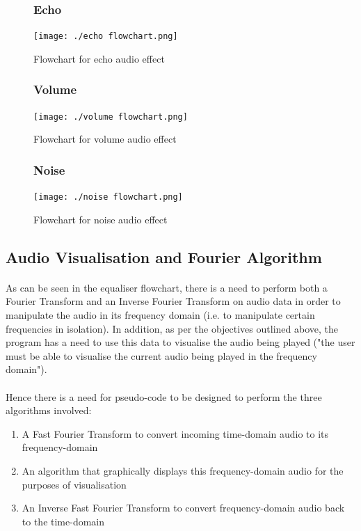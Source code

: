\begin{figure}[H]
	\subsubsection{Echo}
	\texttt{[image: ./echo flowchart.png]}
	\caption{Flowchart for echo audio effect}
\end{figure}

\begin{figure}[H]
	\subsubsection{Volume}
	\texttt{[image: ./volume flowchart.png]}
	\caption{Flowchart for volume audio effect}
\end{figure}

\begin{figure}[H]
	\subsubsection{Noise}
	\texttt{[image: ./noise flowchart.png]}
	\caption{Flowchart for noise audio effect}
\end{figure}

\pagebreak
\subsection{Audio Visualisation and Fourier Algorithm}

\paragraph{} As can be seen in the equaliser flowchart, there is a need to perform both a Fourier Transform and an Inverse Fourier Transform on audio data in order to manipulate the audio in its frequency domain (i.e. to manipulate certain frequencies in isolation). In addition, as per the objectives outlined above, the program has a need to use this data to visualise the audio being played ("the user must be able to visualise the current audio being played in the frequency domain").

\paragraph{} Hence there is a need for pseudo-code to be designed to perform the three algorithms involved:
\begin{enumerate}
	\item A Fast Fourier Transform to convert incoming time-domain audio to its frequency-domain
	\item An algorithm that graphically displays this frequency-domain audio for the purposes of visualisation
	\item An Inverse Fast Fourier Transform to convert frequency-domain audio back to the time-domain
\end{enumerate}

